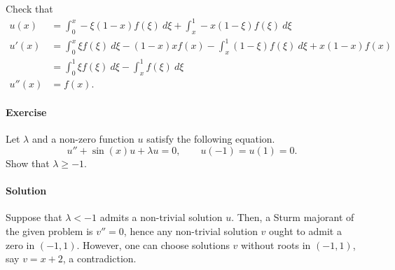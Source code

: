 \documentclass[10pt]{article}
\newcounter{prob}
\newcommand{\problem}{\stepcounter{prob}\paragraph{Exercise \arabic{prob}}}
\newcommand{\solution}{\paragraph{Solution}}
\begin{document}
    Check that \begin{align*}
        u(x) &= \int_0^x -\xi(1 - x) f(\xi) \:d\xi +
            \int_x^1 -x(1 - \xi) f(\xi) \:d\xi \\
        u'(x) &= \int_0^x\xi f(\xi)\:d\xi - (1 - x) x f(x) -
            \int_x^1 (1 - \xi) f(\xi) \:d\xi + x(1 - x) f(x) \\
        &= \int_0^1 \xi f(\xi)\:d\xi - \int_x^1 f(\xi)\:d\xi \\
        u''(x) &= f(x).
    \end{align*}


    \problem Let $\lambda$ and a non-zero function $u$ satisfy the following
    equation. \[
        u'' + \sin(x) u + \lambda u = 0, \qquad
        u(-1) = u(1) = 0.
    \] Show that $\lambda \geq -1$.

    \solution Suppose that $\lambda < -1$ admits a non-trivial solution $u$. Then, a
    Sturm majorant of the given problem is $v'' = 0$, hence any non-trivial solution
    $v$ ought to admit a zero in $(-1, 1)$. However, one can choose solutions $v$
    without roots in $(-1, 1)$, say $v = x + 2$, a contradiction.
\end{document}
